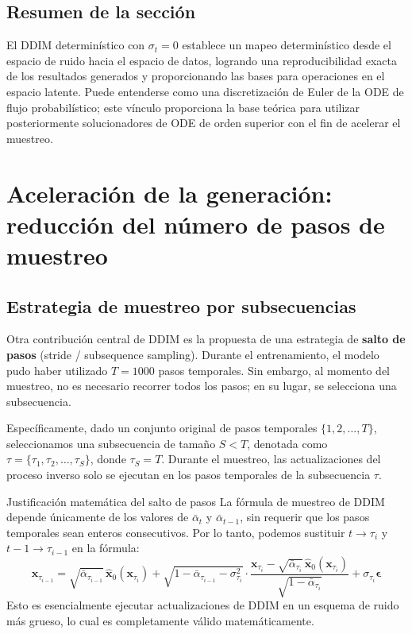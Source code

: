 \documentclass[a4paper]{article}
\begin{document}
\subsection{Resumen de la sección}

El DDIM determinístico con $\sigma_t=0$ establece un mapeo determinístico desde el espacio de ruido hacia el espacio de datos, logrando una reproducibilidad exacta de los resultados generados y proporcionando las bases para operaciones en el espacio latente. Puede entenderse como una discretización de Euler de la ODE de flujo probabilístico; este vínculo proporciona la base teórica para utilizar posteriormente solucionadores de ODE de orden superior con el fin de acelerar el muestreo.
\section{Aceleración de la generación: reducción del número de pasos de muestreo}

\subsection{Estrategia de muestreo por subsecuencias}

Otra contribución central de DDIM es la propuesta de una estrategia de \textbf{salto de pasos} (stride / subsequence sampling). Durante el entrenamiento, el modelo pudo haber utilizado $T=1000$ pasos temporales. Sin embargo, al momento del muestreo, no es necesario recorrer todos los pasos; en su lugar, se selecciona una subsecuencia.

Específicamente, dado un conjunto original de pasos temporales $\{1, 2, \ldots, T\}$, seleccionamos una subsecuencia de tamaño $S < T$, denotada como $\tau = \{\tau_1, \tau_2, \ldots, \tau_S\}$, donde $\tau_S = T$. Durante el muestreo, las actualizaciones del proceso inverso solo se ejecutan en los pasos temporales de la subsecuencia $\tau$.

\begin{importantbox}{Justificación matemática del salto de pasos}
La fórmula de muestreo de DDIM depende únicamente de los valores de $\bar{\alpha}_t$ y $\bar{\alpha}_{t-1}$, sin requerir que los pasos temporales sean enteros consecutivos. Por lo tanto, podemos sustituir $t \to \tau_i$ y $t-1 \to \tau_{i-1}$ en la fórmula:
$$
\mathbf{x}_{\tau_{i-1}} = \sqrt{\bar{\alpha}_{\tau_{i-1}}}\,\hat{\mathbf{x}}_0(\mathbf{x}_{\tau_i}) + \sqrt{1-\bar{\alpha}_{\tau_{i-1}}-\sigma_{\tau_i}^2}\cdot\frac{\mathbf{x}_{\tau_i} - \sqrt{\bar{\alpha}_{\tau_i}}\,\hat{\mathbf{x}}_0(\mathbf{x}_{\tau_i})}{\sqrt{1-\bar{\alpha}_{\tau_i}}} + \sigma_{\tau_i}\boldsymbol{\epsilon}
$$
Esto es esencialmente ejecutar actualizaciones de DDIM en un esquema de ruido más grueso, lo cual es completamente válido matemáticamente.
\end{importantbox}
\end{document}
